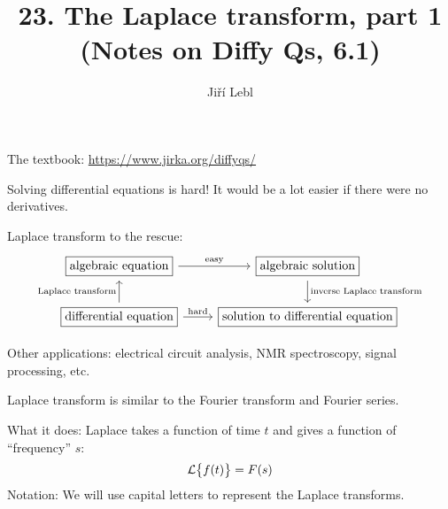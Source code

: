 \documentclass[10pt,aspectratio=169]{beamer}
\author{Ji\v{r}\'i Lebl}
\institute[OSU]{%
Oklahoma State University%
}
\title{23. The Laplace transform, part 1\\(Notes on Diffy Qs, 6.1)}
\date{}
\begin{document}
\begin{frame}
\titlepage


\begin{center}
The textbook: \url{https://www.jirka.org/diffyqs/}
\end{center}
\end{frame}

\begin{frame}
Solving differential equations is hard!
It would be a lot easier if there were no derivatives.

\medskip
\pause

Laplace transform to the rescue:
\[
\begin{tikzcd}[ampersand replacement=\&]
\boxed{\text{algebraic equation}} \arrow[r, "\text{easy}"] \&
\boxed{\text{algebraic solution}} \arrow[d, "\text{inverse Laplace transform}"] \\
\boxed{\text{differential equation}}
\arrow[r, "\text{hard}"] \arrow[u, "\text{Laplace transform}"] \&
\boxed{\text{solution to differential equation}}
\end{tikzcd}
\]

\pause

Other applications: electrical circuit analysis, NMR
spectroscopy, signal processing, etc.

\medskip
\pause

Laplace transform is similar to the Fourier transform and Fourier series.

\medskip
\pause

What it does: Laplace takes a function of time $t$ and gives a function of
``frequency'' $s$:
\[
{\mathcal{L}} \bigl\{ f(t) \bigr\} = F(s)
\]
\pause
Notation: We will use capital letters to represent the Laplace transforms.

\end{frame}
\end{document}
